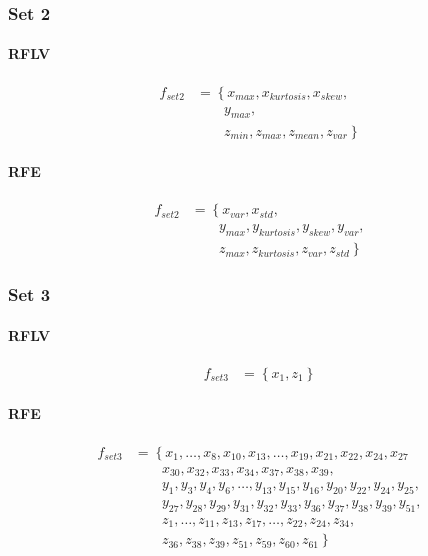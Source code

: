 \documentclass[USenglish]{ifimaster}  %
\begin{document}
\subsubsection{Set 2}
\paragraph{RFLV}
\begin{align}
f_{set2} &= \left\{x_{max}, x_{kurtosis}, x_{skew}, \right.\nonumber\\
&\qquad \left.{} y_{max}, \right.\nonumber\\
&\qquad \left.{} z_{min}, z_{max}, z_{mean}, z_{var} \right\}
\end{align}

\paragraph{RFE}
\begin{align}
f_{set2} &= \left\{x_{var}, x_{std}, \right.\nonumber\\
&\qquad \left.{} y_{max}, y_{kurtosis}, y_{skew}, y_{var}, \right.\nonumber\\
&\qquad \left.{} z_{max}, z_{kurtosis}, z_{var}, z_{std} \right\}
\end{align}


\subsubsection{Set 3}
\paragraph{RFLV}
\begin{align}
f_{set3} &= \left\{x_{1}, z_{1} \right\}
\end{align}


\paragraph{RFE}
\begin{align}
f_{set3} &= \left\{x_{1},\dotsc,x_{8}, x_{10},x_{13},\dotsc,x_{19},x_{21},x_{22},x_{24},x_{27} \right.\nonumber\\
&\qquad \left.{}  x_{30},x_{32},x_{33},x_{34},x_{37},x_{38},x_{39}, \right.\nonumber\\
&\qquad \left.{}  y_{1},y_{3},y_{4},y_{6},\dotsc,y_{13},y_{15},y_{16},y_{20},y_{22},y_{24},y_{25}, \right.\nonumber\\
&\qquad \left.{} y_{27},y_{28},y_{29},y_{31},y_{32},y_{33},y_{36},y_{37},y_{38},y_{39},y_{51}, \right.\nonumber\\
&\qquad \left.{} z_{1},\dotsc,z_{11},z_{13},z_{17},\dotsc,z_{22},z_{24},z_{34},  \right.\nonumber\\
&\qquad \left.{} z_{36},z_{38},z_{39},z_{51},z_{59},z_{60},z_{61} \right\}
\end{align}
\end{document}
